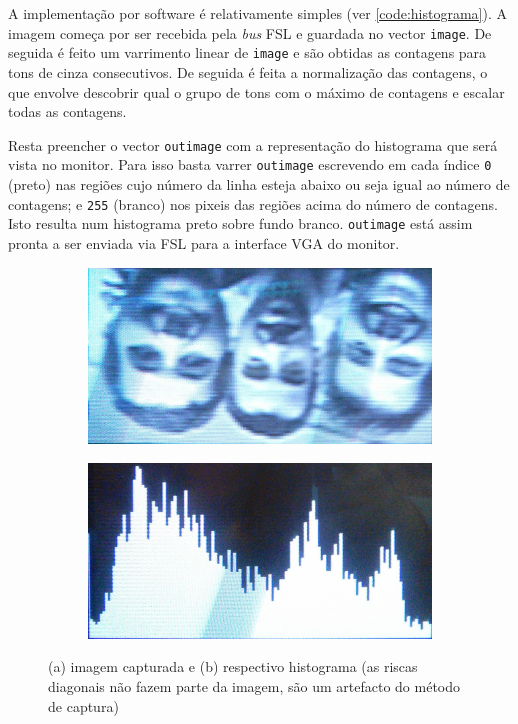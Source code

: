 \documentclass[a4paper,12pt]{article}
\begin{document}
A implementação por software é relativamente simples (ver \autoref{code:histograma}). A imagem começa por ser recebida pela \textit{bus} FSL e guardada no vector \texttt{image}. De seguida é feito um varrimento linear de \texttt{image} e são obtidas as contagens para tons de cinza consecutivos. De seguida é feita a normalização das contagens, o que envolve descobrir qual o grupo de tons com o máximo de contagens e escalar todas as contagens.

\clearpage
Resta preencher o vector \texttt{outimage} com a representação do histograma que será vista no monitor. Para isso basta varrer \texttt{outimage} escrevendo em cada índice \texttt{0} (preto) nas regiões cujo número da linha esteja abaixo ou seja igual ao número de contagens; e \texttt{255} (branco) nos pixeis das regiões acima do número de contagens. Isto resulta num histograma preto sobre fundo branco. \texttt{outimage} está assim pronta a ser enviada via FSL para a interface VGA do monitor.

\begin{figure}[h]
	\centering
	\begin{subfigure}[b]{0.40\textwidth}
		\centering
		\includegraphics[width=\linewidth]{imagens/hist_capturada.png}
		\caption{}
	\end{subfigure}
	\begin{subfigure}[b]{0.40\textwidth}
		\centering
		\includegraphics[width=\linewidth]{imagens/hist_resultado.png}
		\caption{}
	\end{subfigure}
	\caption{(a) imagem capturada e (b) respectivo histograma (as riscas diagonais não fazem parte da imagem, são um artefacto do método de captura)}
	\label{fig:histograma}
\end{figure}
\end{document}
